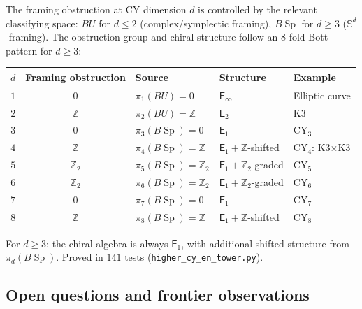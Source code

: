 \documentclass[11pt]{article}
\newcommand{\Z}{\mathbb{Z}}
\newcommand{\bS}{\mathbb{S}}
\newcommand{\Eone}{\mathsf{E}_1}
\newcommand{\Etwo}{\mathsf{E}_2}
\newcommand{\Einf}{\mathsf{E}_{\infty}}
\newcommand{\Sp}{\operatorname{Sp}}
\begin{document}
The framing obstruction at CY dimension $d$ is controlled by the relevant
classifying space: $BU$ for $d \leq 2$ (complex/symplectic framing), $B\Sp$
for $d \geq 3$ ($\bS^d$-framing). The obstruction group and chiral structure
follow an $8$-fold Bott pattern for $d \geq 3$:

\begin{center}
\renewcommand{\arraystretch}{1.2}
\begin{tabular}{cclll}
 \toprule
 $d$ & Framing obstruction & Source & Structure & Example \\
 \midrule
 $1$ & $0$ & $\pi_1(BU) = 0$ & $\Einf$ & Elliptic curve \\
 $2$ & $\Z$ & $\pi_2(BU) = \Z$ & $\Etwo$ & K3 \\
 $3$ & $0$ & $\pi_3(B\Sp) = 0$ & $\Eone$ & CY$_3$ \\
 $4$ & $\Z$ & $\pi_4(B\Sp) = \Z$ & $\Eone + \Z$-shifted & CY$_4$: K3$\times$K3 \\
 $5$ & $\Z_2$ & $\pi_5(B\Sp) = \Z_2$ & $\Eone + \Z_2$-graded & CY$_5$ \\
 $6$ & $\Z_2$ & $\pi_6(B\Sp) = \Z_2$ & $\Eone + \Z_2$-graded & CY$_6$ \\
 $7$ & $0$ & $\pi_7(B\Sp) = 0$ & $\Eone$ & CY$_7$ \\
 $8$ & $\Z$ & $\pi_8(B\Sp) = \Z$ & $\Eone + \Z$-shifted & CY$_8$ \\
 \bottomrule
\end{tabular}
\end{center}

\noindent For $d \geq 3$: the chiral algebra is always $\Eone$, with additional shifted structure from
$\pi_d(B\Sp)$. Proved in $141$ tests (\texttt{higher\_cy\_en\_tower.py}).

\subsection{Open questions and frontier observations}
\label{subsec:open-questions}
\end{document}
